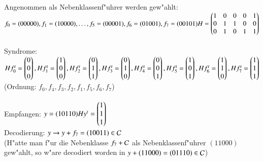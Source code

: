 Angenommen als Nebenklassenf"uhrer werden gew"ahlt:\\
$ f_0=(00000), f_1=(10000), \ldots, f_5=(00001), f_6=(01001), f_7=(00101) \\
\\
H =
\begin{pmatrix}
1 & 0 & 0 & 0 & 1\\
0 & 1 & 1 & 0 & 0\\
0 & 1 & 0 & 1 & 1\\
\end{pmatrix}$\\
\\
Syndrome:\\
$Hf^t_0=\begin{pmatrix}0 \\ 0 \\ 0 \end{pmatrix},
Hf^t_1=\begin{pmatrix}1 \\ 0 \\ 0 \end{pmatrix},
Hf^t_2=\begin{pmatrix}0 \\ 1 \\ 1 \end{pmatrix},
Hf^t_3=\begin{pmatrix}0 \\ 1 \\ 0 \end{pmatrix},
Hf^t_4=\begin{pmatrix}0 \\ 0 \\ 1 \end{pmatrix},\\
Hf^t_5=\begin{pmatrix}1 \\ 0 \\ 1 \end{pmatrix},
Hf^t_6=\begin{pmatrix}1 \\ 1 \\ 0 \end{pmatrix},
Hf^t_7=\begin{pmatrix}1 \\ 1 \\ 1 \end{pmatrix}$\\
(Ordnung: $f_0, f_4, f_3, f_2, f_1, f_5, f_6, f_7$)\\
\\
Empfangen: $y=(10110) \\
Hy^t=\begin{pmatrix} 1 \\ 1 \\ 1 \end{pmatrix}$ \\
Decodierung: $y \rightarrow y + f_7 = (10011) \in \mathcal{C}$\\
(H"atte man f"ur die Nebenklasse $f_7 + \mathcal{C}$ als Nebenklassenf"uhrer $(11000)$ gew"ahlt, so w"are decodiert worden in $y + (11000) = (01110) \in \mathcal{C}$)

